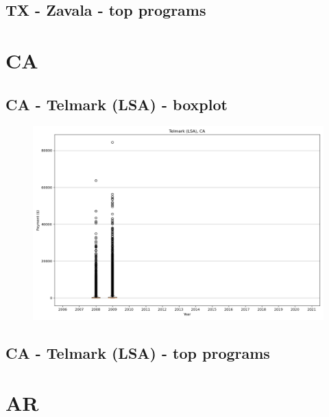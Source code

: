 \subsection*{TX - Zavala - top programs}

\newpage
\section*{CA}
\subsection*{CA - Telmark (LSA) - boxplot}
\begin{figure}[h]
\centering
\includegraphics[width=7in]{../output/boxplots/counties/Telmark (LSA)-CA_boxplot.png}
\end{figure}


\subsection*{CA - Telmark (LSA) - top programs}

\newpage
\section*{AR}
